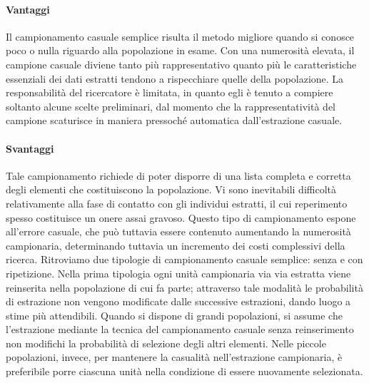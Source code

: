\paragraph{Vantaggi} 
Il campionamento casuale semplice risulta il metodo migliore quando si conosce poco o nulla riguardo alla popolazione in esame. \newline
Con una numerosità elevata, il campione casuale diviene tanto più rappresentativo quanto più le caratteristiche essenziali dei dati estratti tendono a rispecchiare quelle della popolazione. \newline
La responsabilità del ricercatore è limitata, in quanto egli è tenuto a compiere soltanto alcune scelte preliminari, dal momento che la rappresentatività del campione scaturisce in maniera pressoché automatica dall'estrazione casuale.

\paragraph{Svantaggi} 
Tale campionamento richiede di poter disporre di una lista completa e corretta degli elementi che costituiscono la popolazione. \newline
Vi sono inevitabili difficoltà relativamente alla fase di contatto con gli individui estratti, il cui reperimento spesso costituisce un onere assai gravoso. \newline
Questo tipo di campionamento espone all'errore casuale, che può tuttavia essere contenuto aumentando la numerosità campionaria, determinando tuttavia un incremento dei costi complessivi della ricerca. \newline
Ritroviamo due tipologie di campionamento casuale semplice: senza e con ripetizione. \newline
Nella prima tipologia ogni unità campionaria via via estratta viene reinserita nella popolazione di cui fa parte; attraverso tale modalità le probabilità di estrazione non vengono modificate dalle successive estrazioni, dando luogo a stime più attendibili.\newline
Quando si dispone di grandi popolazioni, si assume che l’estrazione mediante la tecnica del campionamento casuale senza reinserimento non modifichi la probabilità di selezione degli altri elementi. \newline
Nelle piccole popolazioni, invece, per mantenere la casualità nell'estrazione campionaria, è preferibile porre ciascuna unità nella condizione di essere nuovamente selezionata.

